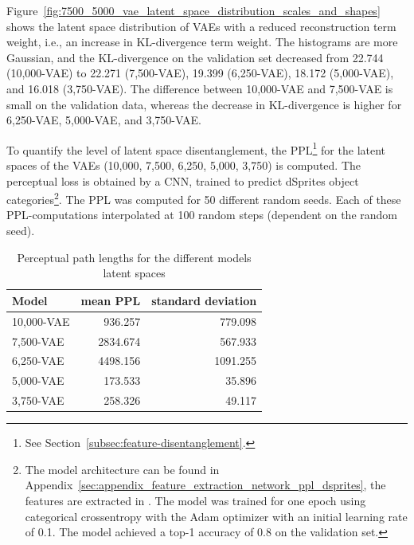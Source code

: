 Figure~\ref{fig:7500_5000_vae_latent_space_distribution_scales_and_shapes} shows the latent space distribution of \acp{VAE} with a reduced reconstruction term weight, i.e., an increase in \ac{KL-divergence} term weight.
The histograms are more Gaussian, and the \ac{KL-divergence} on the validation set decreased from 22.744 (10,000-\ac{VAE}) to 22.271 (7,500-\ac{VAE}), 19.399 (6,250-\ac{VAE}), 18.172 (5,000-\ac{VAE}), and 16.018 (3,750-\ac{VAE}).
The difference between 10,000-\ac{VAE} and 7,500-\ac{VAE} is small on the validation data, whereas the decrease in \ac{KL-divergence} is higher for 6,250-\ac{VAE}, 5,000-\ac{VAE}, and 3,750-\ac{VAE}.

To quantify the level of latent space disentanglement, the \ac{PPL}\footnote{See Section~\ref{subsec:feature-disentanglement}.} for the latent spaces of the \acp{VAE} (10,000, 7,500, 6,250, 5,000, 3,750) is computed.
The perceptual loss is obtained by a \ac{CNN}, trained to predict dSprites object categories\footnote{The model architecture can be found in Appendix~\ref{sec:appendix_feature_extraction_network_ppl_dsprites}, the features are extracted in . The model was trained for one epoch using categorical crossentropy with the Adam optimizer with an initial learning rate of 0.1. The model achieved a top-1 accuracy of 0.8 on the validation set.}.
The \ac{PPL} was computed for 50 different random seeds.
Each of these \ac{PPL}-computations interpolated at 100 random steps (dependent on the random seed).

\begin{table}
    \centering
    \begin{tabular}{lrr}
        \toprule
        Model           & mean \ac{PPL} & standard deviation \\
        \midrule
        10,000-\ac{VAE} & 936.257       & 779.098            \\
        7,500-\ac{VAE}  & 2834.674      & 567.933            \\
        6,250-\ac{VAE}  & 4498.156      & 1091.255           \\
        5,000-\ac{VAE}  & 173.533       & 35.896             \\
        3,750-\ac{VAE}  & 258.326       & 49.117             \\
        \bottomrule
    \end{tabular}
    \caption[dSprites-VAEs: Perceptual Path Lengths]{Perceptual path lengths for the different models latent spaces}
    \label{tab:ppl-dsprites}
\end{table}

